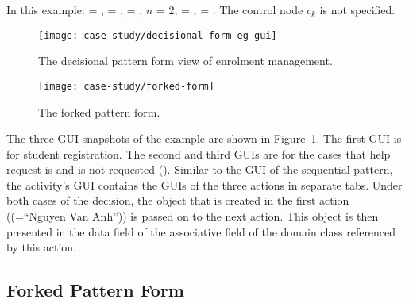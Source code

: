 In this example:  = ,  = ,  = , $ n $ = 2,  = ,  = .
The control node $ c_k $ is not specified.

\begin{figure}[ht]
	\begin{center}
		\texttt{[image: case-study/decisional-form-eg-gui]}
	\end{center}
	\caption{The decisional pattern form view of enrolment management.} %
	\label{fig:decisional-form-eg-gui}
\end{figure}

\begin{figure}%
	\begin{center}
		\texttt{[image: case-study/forked-form]}
	\end{center}
	\caption{The forked pattern form.} %
	\label{fig:forked-form}
\end{figure}

The three GUI snapshots of the example are shown in Figure~\ref{fig:decisional-form-eg-gui}. The first GUI is for student registration. The second and third GUIs are for the cases that help request is and is not requested (\resp). Similar to the GUI of the sequential pattern, the activity's GUI contains the GUIs of the three actions in separate tabs. Under both cases of the decision, the  object that is created in the first action (\eg {}(=``Nguyen Van Anh'')) is passed on to the next action. This object is then presented in the data field of the associative field  of the domain class referenced by this action.

\subsection{Forked Pattern Form} \label{sect:forked-pattern}

